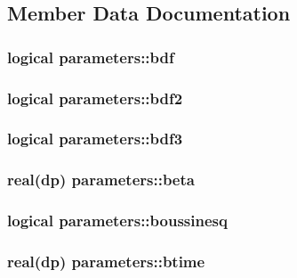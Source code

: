 \subsection{Member Data Documentation}
\hypertarget{classparameters_a3eb9bfb234c72de12ef64cdf189eb334}{
\subsubsection[{bdf}]{\setlength{\rightskip}{0pt plus 5cm}logical parameters\-::bdf}}\label{classparameters_a3eb9bfb234c72de12ef64cdf189eb334}
\hypertarget{classparameters_a7b4b5b884b0646fdebae149c324efee0}{
\subsubsection[{bdf2}]{\setlength{\rightskip}{0pt plus 5cm}logical parameters\-::bdf2}}\label{classparameters_a7b4b5b884b0646fdebae149c324efee0}
\hypertarget{classparameters_aa8493f6c1a3991dc5c6fe99cd83da8a0}{
\subsubsection[{bdf3}]{\setlength{\rightskip}{0pt plus 5cm}logical parameters\-::bdf3}}\label{classparameters_aa8493f6c1a3991dc5c6fe99cd83da8a0}
\hypertarget{classparameters_a7f21697b41b2321085587f428da3aae5}{
\subsubsection[{beta}]{\setlength{\rightskip}{0pt plus 5cm}real(dp) parameters\-::beta}}\label{classparameters_a7f21697b41b2321085587f428da3aae5}
\hypertarget{classparameters_a413d8173c9a8a2e2d347abef37428f2c}{
\subsubsection[{boussinesq}]{\setlength{\rightskip}{0pt plus 5cm}logical parameters\-::boussinesq}}\label{classparameters_a413d8173c9a8a2e2d347abef37428f2c}
\hypertarget{classparameters_a76fa638958512a751a8bf818471774ac}{
\subsubsection[{btime}]{\setlength{\rightskip}{0pt plus 5cm}real(dp) parameters\-::btime}}\label{classparameters_a76fa638958512a751a8bf818471774ac}
